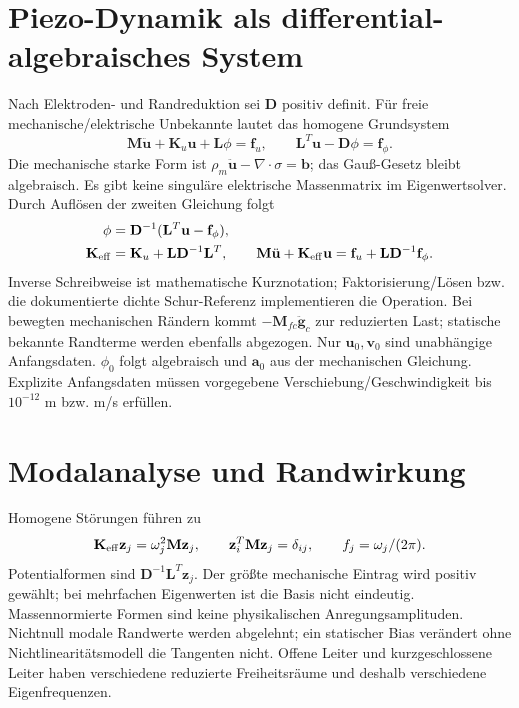 \section{Piezo-Dynamik als differential-algebraisches System}
Nach Elektroden- und Randreduktion sei $\mathbf D$ positiv definit. Für freie
mechanische/elektrische Unbekannte lautet das homogene Grundsystem
\begin{equation}\label{eq:dae}
\mathbf M\ddot{\mathbf u}+\mathbf K_u\mathbf u+\mathbf L\phi=\mathbf f_u,
\qquad\mathbf L^T\mathbf u-\mathbf D\phi=\mathbf f_\phi.
\end{equation}
Die mechanische starke Form ist $\rho_m\ddot{\mathbf u}-\nabla\cdot\sigma=\mathbf b$;
das Gauß-Gesetz bleibt algebraisch. Es gibt keine singuläre elektrische
Massenmatrix im Eigenwertsolver. Durch Auflösen der zweiten Gleichung folgt
\begin{align}\label{eq:dynamic-schur}
\phi&=\mathbf D^{-1}(\mathbf L^T\mathbf u-\mathbf f_\phi),\\
\mathbf K_{\rm eff}&=\mathbf K_u+\mathbf L\mathbf D^{-1}\mathbf L^T,\qquad
\mathbf M\ddot{\mathbf u}+\mathbf K_{\rm eff}\mathbf u
=\mathbf f_u+\mathbf L\mathbf D^{-1}\mathbf f_\phi.\nonumber
\end{align}
Inverse Schreibweise ist mathematische Kurznotation; Faktorisierung/Lösen
bzw. die dokumentierte dichte Schur-Referenz implementieren die Operation.
Bei bewegten mechanischen Rändern kommt $-\mathbf M_{fc}\ddot{\mathbf g}_c$
zur reduzierten Last; statische bekannte Randterme werden ebenfalls abgezogen.
Nur $\mathbf u_0,\mathbf v_0$ sind unabhängige Anfangsdaten.
$\phi_0$ folgt algebraisch und $\mathbf a_0$ aus der mechanischen Gleichung.
Explizite Anfangsdaten müssen vorgegebene Verschiebung/Geschwindigkeit bis
$10^{-12}$ m bzw. m/s erfüllen.

\section{Modalanalyse und Randwirkung}
Homogene Störungen führen zu
\begin{equation}\label{eq:modes}
\mathbf K_{\rm eff}\mathbf z_j=\omega_j^2\mathbf M\mathbf z_j,
\qquad\mathbf z_i^T\mathbf M\mathbf z_j=\delta_{ij},
\qquad f_j=\omega_j/(2\pi).
\end{equation}
Potentialformen sind $\mathbf D^{-1}\mathbf L^T\mathbf z_j$.
Der größte mechanische Eintrag wird positiv gewählt; bei mehrfachen
Eigenwerten ist die Basis nicht eindeutig. Massennormierte Formen sind keine
physikalischen Anregungsamplituden. Nichtnull modale Randwerte werden
abgelehnt; ein statischer Bias verändert ohne Nichtlinearitätsmodell die
Tangenten nicht. Offene Leiter und kurzgeschlossene Leiter haben verschiedene
reduzierte Freiheitsräume und deshalb verschiedene Eigenfrequenzen.

